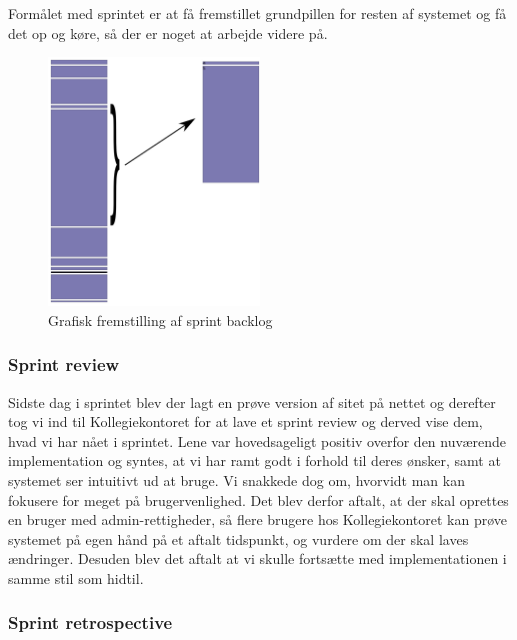 \documentclass[12pt, a4paper]{report}
\begin{document}
Formålet med sprintet er at få fremstillet grundpillen for resten af systemet og få det op og køre, så der er noget at arbejde videre på.

\begin{figure}
\includegraphics[width=0.5\textwidth]{sprint1log}
\caption{Grafisk fremstilling af sprint backlog}
\label{sprintlog1}
\end{figure}

\subsubsection{Sprint review}

Sidste dag i sprintet blev der lagt en prøve version af sitet på nettet og derefter tog vi ind til Kollegiekontoret for at lave et sprint review og derved vise dem, hvad vi har nået i sprintet. Lene var hovedsageligt positiv overfor den nuværende implementation og syntes, at vi har ramt godt i forhold til deres ønsker, samt at systemet ser intuitivt ud at bruge. Vi snakkede dog om, hvorvidt man kan fokusere for meget på brugervenlighed. Det blev derfor aftalt, at der skal oprettes en bruger med admin-rettigheder, så flere brugere hos Kollegiekontoret kan prøve systemet på egen hånd på et aftalt tidspunkt, og vurdere om der skal laves ændringer. Desuden blev det aftalt at vi skulle fortsætte med implementationen i samme stil som hidtil.

\subsubsection{Sprint retrospective}
\end{document}
